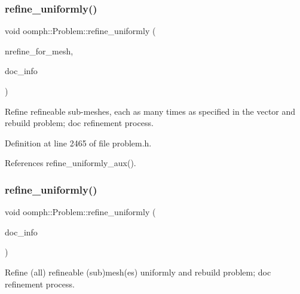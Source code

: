 \subsubsection{\texorpdfstring{refine\+\_\+uniformly()}{refine\_uniformly()}\hspace{0.1cm}{\footnotesize\ttfamily [2/6]}}
{\footnotesize\ttfamily void oomph\+::\+Problem\+::refine\+\_\+uniformly (\begin{DoxyParamCaption}\item[{const \hyperlink{classoomph_1_1Vector}{Vector}$<$ unsigned $>$ \&}]{nrefine\+\_\+for\+\_\+mesh,  }\item[{\hyperlink{classoomph_1_1DocInfo}{Doc\+Info} \&}]{doc\+\_\+info }\end{DoxyParamCaption})\hspace{0.3cm}{\ttfamily [inline]}}



Refine refineable sub-\/meshes, each as many times as specified in the vector and rebuild problem; doc refinement process. 



Definition at line 2465 of file problem.\+h.



References refine\+\_\+uniformly\+\_\+aux().

\mbox{\label{classoomph_1_1Problem_ae4ccf79fde59556d93af947618b6c80b}} 
\subsubsection{\texorpdfstring{refine\+\_\+uniformly()}{refine\_uniformly()}\hspace{0.1cm}{\footnotesize\ttfamily [3/6]}}
{\footnotesize\ttfamily void oomph\+::\+Problem\+::refine\+\_\+uniformly (\begin{DoxyParamCaption}\item[{\hyperlink{classoomph_1_1DocInfo}{Doc\+Info} \&}]{doc\+\_\+info }\end{DoxyParamCaption})\hspace{0.3cm}{\ttfamily [inline]}}



Refine (all) refineable (sub)mesh(es) uniformly and rebuild problem; doc refinement process. 




